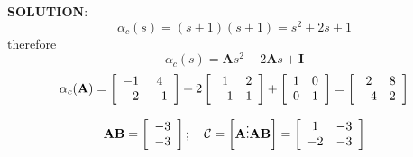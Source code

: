 \textbf{SOLUTION}:
\[
\alpha_c(s) = (s + 1)(s + 1) = s^2 + 2s + 1
\]
therefore
\[
\alpha_c(s) = \mathbf{A}s^2 + 2\mathbf{A}s + \mathbf{I}
\]
\[
\alpha _c ({\bf{A}}) = \left[ {\begin{array}{*{20}c}
   { - 1} & 4  \\
   { - 2} & { - 1}  \\
\end{array}} \right] + 2\left[ {\begin{array}{*{20}c}
   1 & 2  \\
   { - 1} & 1  \\
\end{array}} \right] + \left[ {\begin{array}{*{20}c}
   1 & 0  \\
   0 & 1  \\
\end{array}} \right] = \left[ {\begin{array}{*{20}c}
   2 & 8  \\
   { - 4} & 2  \\
\end{array}} \right]
\]

\[
{\bf{AB}} = \left[ {\begin{array}{*{20}c}
   { - 3}  \\
   { - 3}  \\
\end{array}} \right];\quad \mathcal{C} = \left[ {{\bf{A}} \vdots {\bf{AB}}} \right] = \left[ {\begin{array}{*{20}c}
   1 & { - 3}  \\
   { - 2} & { - 3}  \\
\end{array}} \right]
\]

